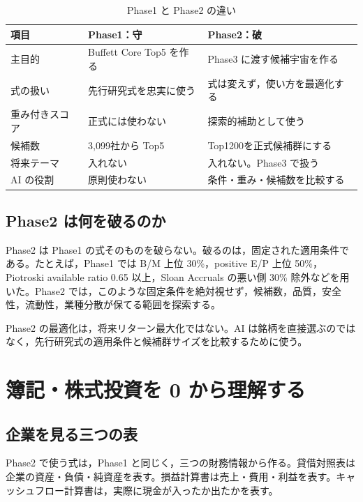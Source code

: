 \documentclass[a4paper,10pt]{article}
\newcommand{\1}{\mathbf{1}}
\begin{document}
\begin{table}[tbp]
\caption{Phase1 と Phase2 の違い}
\label{tab:p1-p2}
\centering
\begin{tabular}{p{35mm}p{53mm}p{53mm}}
\toprule
項目 & Phase1：守 & Phase2：破 \\
\midrule
主目的 & Buffett Core Top5 を作る & Phase3 に渡す候補宇宙を作る \\
式の扱い & 先行研究式を忠実に使う & 式は変えず，使い方を最適化する \\
重み付きスコア & 正式には使わない & 探索的補助として使う \\
候補数 & 3,099社から Top5 & Top1200を正式候補群にする \\
将来テーマ & 入れない & 入れない。Phase3 で扱う \\
AI の役割 & 原則使わない & 条件・重み・候補数を比較する \\
\bottomrule
\end{tabular}
\end{table}

\subsection{Phase2 は何を破るのか}
Phase2 は Phase1 の式そのものを破らない。破るのは，固定された適用条件である。たとえば，Phase1 では B/M 上位 30\%，positive E/P 上位 50\%，Piotroski available ratio 0.65 以上，Sloan Accruals の悪い側 30\% 除外などを用いた。Phase2 では，このような固定条件を絶対視せず，候補数，品質，安全性，流動性，業種分散が保てる範囲を探索する。

\begin{warningbox}
Phase2 の最適化は，将来リターン最大化ではない。AI は銘柄を直接選ぶのではなく，先行研究式の適用条件と候補群サイズを比較するために使う。
\end{warningbox}

\section{簿記・株式投資を 0 から理解する}

\subsection{企業を見る三つの表}
Phase2 で使う式は，Phase1 と同じく，三つの財務情報から作る。貸借対照表は企業の資産・負債・純資産を表す。損益計算書は売上・費用・利益を表す。キャッシュフロー計算書は，実際に現金が入ったか出たかを表す。
\end{document}
